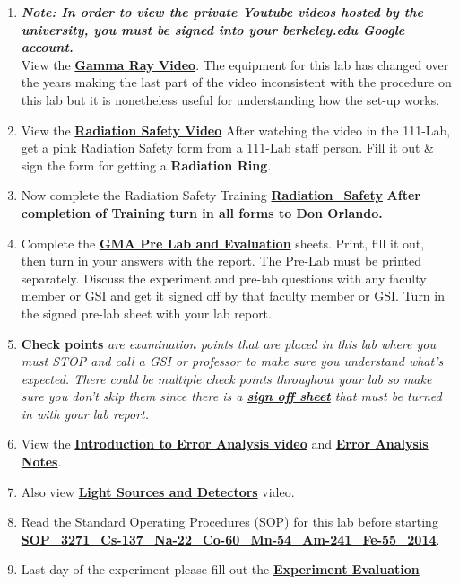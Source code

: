 \documentclass{../lab}
\begin{document}
\begin{enumerate}
    \item \emph{\textbf{Note: In order to view the private Youtube videos hosted by the university, you must be signed into your berkeley.edu Google account.}} \\
    View the \href{http://youtu.be/cZGMngx-6yE}{\textbf{Gamma Ray Video}}. The equipment for this lab has changed over the years making the last part of the video inconsistent with the procedure on this lab but it is nonetheless useful for understanding how the set-up works.

    \item View the \href{http://youtu.be/KHxtzF5pZZM}{\textbf{\textbf{Radiation Safety Video}}} After watching the video in the 111-Lab, get a pink Radiation Safety form from a 111-Lab staff person. Fill it out \& sign the form for getting a \textbf{Radiation Ring}.

    \item Now complete the Radiation Safety Training \href{http://experimentationlab.berkeley.edu/RadiationSafety}{\textbf{Radiation\_Safety}} \textbf{After completion of Training turn in all forms to Don Orlando.}

    \item Complete the \href{http://experimentationlab.berkeley.edu/GMAPreLab}{\textbf{GMA Pre Lab and Evaluation}} sheets. Print, fill it out, then turn  in your answers with the report. The Pre-Lab must be printed separately. Discuss the experiment and pre-lab questions with any faculty member or GSI and get it signed off by that faculty member or GSI. Turn in the signed pre-lab sheet with your lab report.

    \item \textbf{Check points} \emph{are examination points that are placed in this lab where you must STOP and call a GSI or professor to make sure you understand what's expected. There could  be multiple check points throughout your lab so make sure you don't skip them since there is a \href{http://experimentationlab.berkeley.edu/gmacheckpoints}{\textbf{sign off sheet}} that must be turned in with your lab report.}

    \item View the \href{http://youtu.be/jR54387Wd6c}{\textbf{Introduction to Error Analysis video}} and \href{http://experimentationlab.berkeley.edu/EAX}{\textbf{\textbf{Error Analysis Notes}}}.

    \item Also view \href{http://youtu.be/lQKLakISoBA}{\textbf{Light Sources and Detectors}} video.

    \item Read the Standard Operating Procedures (SOP) for this lab before starting \href{http://experimentationlab.berkeley.edu/sites/default/files/images/SOP\_3271\_Cs-137\_Na-22\_Co-60\_Mn-54\_Am-241\_Fe-55\_2014.pdf}{\textbf{SOP\_3271\_Cs-137\_Na-22\_Co-60\_Mn-54\_Am-241\_Fe-55\_2014}}.

    \item Last day of the experiment please fill out the \href{\ExperimentEvaluation}{\textbf{Experiment Evaluation}}

\end{enumerate}
\end{document}
